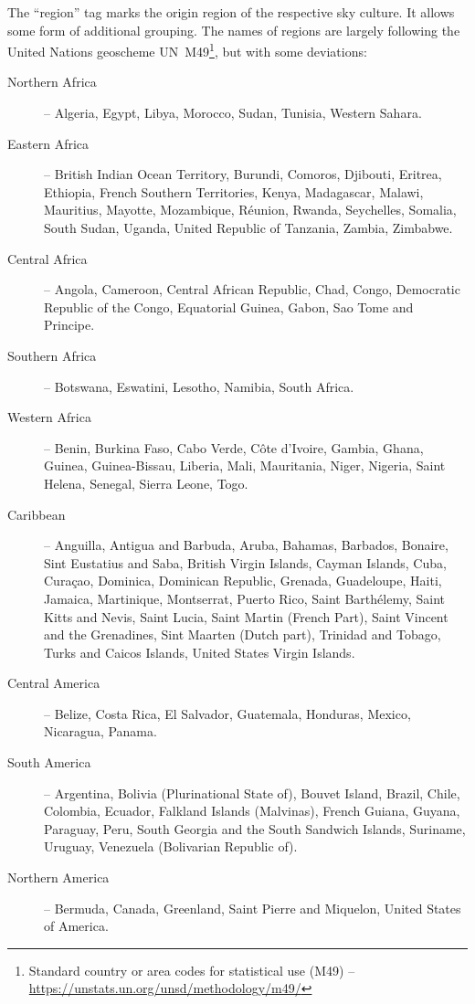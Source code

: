 The ``region'' tag marks the origin region of the respective sky culture.
It allows some form of additional grouping. The names of regions are largely following the United Nations
geoscheme UN~M49\footnote{Standard country or area codes for statistical use (M49) -- \url{https://unstats.un.org/unsd/methodology/m49/}}, 
but with some deviations:
\begin{description}
	\item[Northern Africa] -- Algeria, Egypt, Libya, Morocco, Sudan, Tunisia, Western Sahara.
	\item[Eastern Africa] -- British Indian Ocean Territory, Burundi, Comoros, Djibouti, Eritrea, Ethiopia, French Southern Territories, Kenya,
          Madagascar, Malawi, Mauritius, Mayotte, Mozambique, Réunion, Rwanda, Seychelles, Somalia, South Sudan, Uganda, United Republic of Tanzania, Zambia, Zimbabwe.
	\item[Central Africa] -- Angola, Cameroon, Central African Republic, Chad, Congo, Democratic Republic of the Congo, Equatorial Guinea, Gabon, Sao Tome and Principe.
	\item[Southern Africa] -- Botswana, Eswatini, Lesotho, Namibia, South Africa.
	\item[Western Africa] -- Benin, Burkina Faso, Cabo Verde, Côte d’Ivoire, Gambia, Ghana, Guinea, Guinea-Bissau, Liberia,
          Mali, Mauritania, Niger, Nigeria, Saint Helena, Senegal, Sierra Leone, Togo.
	\item[Caribbean] -- Anguilla, Antigua and Barbuda, Aruba, Bahamas, Barbados, Bonaire, Sint Eustatius and Saba, British Virgin Islands,
          Cayman Islands, Cuba, Curaçao, Dominica, Dominican Republic, Grenada, Guadeloupe, Haiti, Jamaica, Martinique, Montserrat, Puerto Rico, Saint Barthélemy,
          Saint Kitts and Nevis, Saint Lucia, Saint Martin (French Part), Saint Vincent and the Grenadines, Sint Maarten (Dutch part),
          Trinidad and Tobago, Turks and Caicos Islands, United States Virgin Islands.
	\item[Central America] -- Belize, Costa Rica, El Salvador, Guatemala, Honduras, Mexico, Nicaragua, Panama.
	\item[South America] -- Argentina, Bolivia (Plurinational State of), Bouvet Island, Brazil, Chile, Colombia, Ecuador,
          Falkland Islands (Malvinas), French Guiana, Guyana, Paraguay, Peru, South Georgia and the South Sandwich Islands, Suriname,
          Uruguay, Venezuela (Bolivarian Republic of).
	\item[Northern America] -- Bermuda, Canada, Greenland, Saint Pierre and Miquelon, United States of America.

\end{description}
